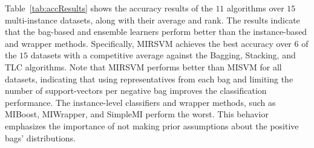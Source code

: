 \documentclass[preprint,12pt]{elsarticle}
\begin{document}
\begin{table}[t!]
{}\vspace{-0.6em}
\label{fig:BonfDunnacc}\vspace{-0.5em}
\label{tab:statacc}
\scriptsize
{}
\end{table}
Table~\ref{tab:accResults} shows the accuracy results of the $11$ algorithms over $15$ multi-instance datasets, along with their average and rank. The results indicate that the bag-based and ensemble learners perform better than the instance-based and wrapper methods. Specifically, MIRSVM achieves the best accuracy over $6$ of the $15$ datasets with a competitive average against the Bagging, Stacking, and TLC algorithms. Note that MIRSVM performs better than MISVM for all datasets, indicating that using representatives from each bag and limiting the number of support-vectors per negative bag improves the classification performance. The instance-level classifiers and wrapper methods, such as MIBoost, MIWrapper, and SimpleMI perform the worst. This behavior emphasizes the importance of not making prior assumptions about the positive bags' distributions. 
\end{document}
